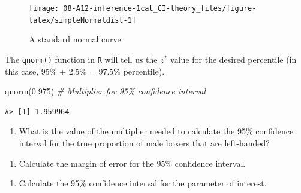 \documentclass[
]{report}
\newenvironment{Shaded}{\begin{snugshade}}{\end{snugshade}}
\newcommand{\CommentTok}[1]{\textcolor[rgb]{0.56,0.35,0.01}{\textit{#1}}}
\newcommand{\FloatTok}[1]{\textcolor[rgb]{0.00,0.00,0.81}{#1}}
\newcommand{\FunctionTok}[1]{\textcolor[rgb]{0.00,0.00,0.00}{#1}}
\newcommand{\NormalTok}[1]{#1}
\providecommand{\tightlist}{%
  \setlength{\itemsep}{0pt}\setlength{\parskip}{0pt}}
\begin{document}
\begin{figure}

{\centering \texttt{[image: 08-A12-inference-1cat\_CI-theory\_files/figure-latex/simpleNormaldist-1]} 

}

\caption{A standard normal curve.}\label{fig:simpleNormaldist}
\end{figure}
\vspace{0.1in}

The \texttt{qnorm()} function in \texttt{R} will tell us the \(z^*\) value for the desired percentile (in this case, 95\% + 2.5\% = 97.5\% percentile).

\begin{Shaded}
\begin{Highlighting}[]
\FunctionTok{qnorm}\NormalTok{(}\FloatTok{0.975}\NormalTok{) }\CommentTok{\# Multiplier for 95\% confidence interval}
\end{Highlighting}
\end{Shaded}

\begin{verbatim}
#> [1] 1.959964
\end{verbatim}

\begin{enumerate}
\def\labelenumi{\arabic{enumi}.}
\setcounter{enumi}{4}
\tightlist
\item
  What is the value of the multiplier needed to calculate the 95\% confidence interval for the true proportion of male boxers that are left-handed?
\end{enumerate}

\vspace{1in}

\begin{enumerate}
\def\labelenumi{\arabic{enumi}.}
\setcounter{enumi}{5}
\tightlist
\item
  Calculate the margin of error for the 95\% confidence interval.
\end{enumerate}

\vspace{1in}

\begin{enumerate}
\def\labelenumi{\arabic{enumi}.}
\setcounter{enumi}{6}
\tightlist
\item
  Calculate the 95\% confidence interval for the parameter of interest.
\end{enumerate}

\vspace{0.5in}
\end{document}
